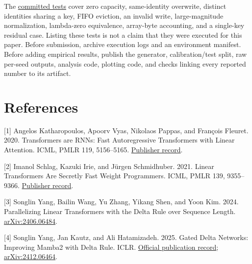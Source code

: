 \documentclass[11pt,a4paper]{article}
\begin{document}
The \href{https://github.com/Summer110622/SummerLinearAttention/blob/036512212ed0f7d2456988cb4b523599064a7e6f/tests/test_reference.py}{committed tests} cover zero capacity, same-identity overwrite, distinct identities sharing a key, FIFO eviction, an invalid write, large-magnitude normalization, lambda-zero equivalence, array-byte accounting, and a single-key residual case. Listing these tests is not a claim that they were executed for this paper. Before submission, archive execution logs and an environment manifest. Before adding empirical results, publish the generator, calibration/test split, raw per-seed outputs, analysis code, plotting code, and checks linking every reported number to its artifact.


\section{References}\label{references}

\small\setlength{\parskip}{4pt}\setlength{\emergencystretch}{2em}


{[}1{]} Angelos Katharopoulos, Apoorv Vyas, Nikolaos Pappas, and François Fleuret. 2020. Transformers are RNNs: Fast Autoregressive Transformers with Linear Attention. ICML, PMLR 119, 5156--5165. \href{https://proceedings.mlr.press/v119/katharopoulos20a.html}{Publisher record}.


{[}2{]} Imanol Schlag, Kazuki Irie, and Jürgen Schmidhuber. 2021. Linear Transformers Are Secretly Fast Weight Programmers. ICML, PMLR 139, 9355--9366. \href{https://proceedings.mlr.press/v139/schlag21a.html}{Publisher record}.


{[}3{]} Songlin Yang, Bailin Wang, Yu Zhang, Yikang Shen, and Yoon Kim. 2024. Parallelizing Linear Transformers with the Delta Rule over Sequence Length. \href{https://arxiv.org/abs/2406.06484}{arXiv:2406.06484}.


{[}4{]} Songlin Yang, Jan Kautz, and Ali Hatamizadeh. 2025. Gated Delta Networks: Improving Mamba2 with Delta Rule. ICLR. \href{https://research.nvidia.com/labs/lpr/publication/yanggated2024/}{Official publication record}; \href{https://arxiv.org/abs/2412.06464}{arXiv:2412.06464}.
\end{document}

